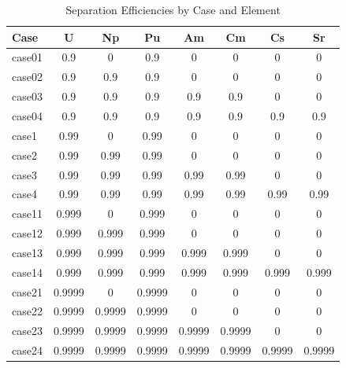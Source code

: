 \begin{table}[htbp]
\begin{center}
\caption{Separation Efficiencies by Case and Element}
\label{ses_table9}
\begin{tabular}{|l|c|c|c|c|c|c|c|}
\hline
\textbf{Case} & \textbf{U} & \textbf{Np} & \textbf{Pu} & \textbf{Am} & \textbf{Cm} & \textbf{Cs} & \textbf{Sr} \\
\hline
case01 & 0.9    & 0      & 0.9    & 0      & 0      & 0      & 0      \\
case02 & 0.9    & 0.9    & 0.9    & 0      & 0      & 0      & 0      \\
case03 & 0.9    & 0.9    & 0.9    & 0.9    & 0.9    & 0      & 0      \\
case04 & 0.9    & 0.9    & 0.9    & 0.9    & 0.9    & 0.9    & 0.9    \\
case1  & 0.99   & 0      & 0.99   & 0      & 0      & 0      & 0      \\
case2  & 0.99   & 0.99   & 0.99   & 0      & 0      & 0      & 0      \\
case3  & 0.99   & 0.99   & 0.99   & 0.99   & 0.99   & 0      & 0      \\
case4  & 0.99   & 0.99   & 0.99   & 0.99   & 0.99   &0.99    & 0.99   \\
case11 & 0.999  & 0      & 0.999  & 0      & 0      & 0      & 0      \\
case12 & 0.999  & 0.999  & 0.999  & 0      & 0      & 0      & 0      \\
case13 & 0.999  & 0.999  & 0.999  & 0.999  & 0.999  & 0      & 0      \\
case14 & 0.999  & 0.999  & 0.999  & 0.999  & 0.999  & 0.999  & 0.999  \\
case21 & 0.9999 & 0      & 0.9999 & 0      & 0      & 0      & 0      \\
case22 & 0.9999 & 0.9999 & 0.9999 & 0      & 0      & 0      & 0      \\
case23 & 0.9999 & 0.9999 & 0.9999 & 0.9999 & 0.9999 & 0      & 0      \\
case24 & 0.9999 & 0.9999 & 0.9999 & 0.9999 & 0.9999 & 0.9999 & 0.9999 \\
\hline
\end{tabular}
\end{center}
\end{table}




